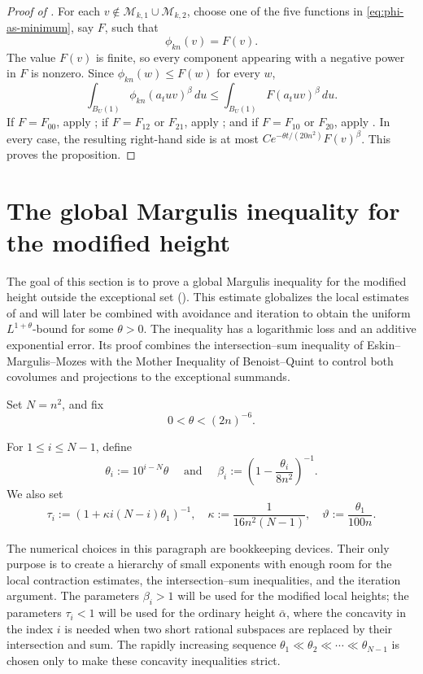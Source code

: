 \documentclass[reqno,11pt]{amsart}
\numberwithin{equation}{section}
\theoremstyle{definition}
\theoremstyle{remark}
\begin{document}
\begin{proof}[Proof of ]
For each $v\notin\mathcal M_{k,1}\cup\mathcal M_{k,2}$, choose one of
the five functions in \eqref{eq:phi-as-minimum}, say $F$, such that
$$
\phi_{kn}(v)=F(v).
$$
The value $F(v)$ is finite, so every component appearing with a negative
power in $F$ is nonzero. Since $\phi_{kn}(w)\le F(w)$ for every $w$,
$$
\int_{B_{U}(1)}\phi_{kn}(a_tuv)^\beta\,du
\le
\int_{B_{U}(1)}F(a_tuv)^\beta\,du.
$$
If $F=F_{00}$, apply ; if
$F=F_{12}$ or $F_{21}$, apply
; and if $F=F_{10}$ or $F_{20}$,
apply . In every case, the resulting right-hand
side is at most
$
C e^{-\theta t/(20n^2)}F(v)^\beta
$.
This proves the proposition.
\end{proof}




\section{The global Margulis inequality for the modified height}
\label{s:globalheight}
The goal of this section is to prove a global Margulis inequality for the modified height outside the exceptional set (). This estimate globalizes the
local estimates of  and will later be
combined with avoidance and iteration to obtain the uniform
$L^{1+\theta}$-bound for some $\theta>0$.
The inequality has a logarithmic loss and an additive exponential error.
Its proof combines the intersection--sum inequality of
Eskin--Margulis--Mozes \cite[Lemma~5.6]{eskin-margulis-mozes:1998} with
the Mother Inequality of Benoist--Quint
\cite[Proposition~3.1]{benoist-quint:2012} to control both covolumes and
projections
to the exceptional summands.
\medskip 

Set $N=n^2$, and fix
$$
0<\theta<(2n)^{-6}.
$$

For $1\le i\le N-1$, define
\begin{equation}\label{theta}
\theta_i:=10^{i-N}\theta
\quad \text{ and }\quad
\beta_i:=\left(1-\frac{\theta_i}{8n^2}\right)^{-1}.
\end{equation}
We also set
\begin{equation}\label{eta}
\tau_i:=
\left(1+\kappa i(N-i)\theta_1\right)^{-1},
\quad
\kappa:=\frac{1}{16n^2(N-1)},\quad\vartheta:=\frac{\theta_1}{100n}.
\end{equation}

The numerical choices in this paragraph are bookkeeping devices. Their only
purpose is to create a hierarchy of small exponents with enough room for the
local contraction estimates, the intersection--sum inequalities, and the
iteration argument. The parameters $\beta_i>1$ will be used for the
modified local heights; the parameters $\tau_i<1$ will be used for the
ordinary height $\bar\alpha$, where the concavity in the index $i$ is
needed when two short rational subspaces are replaced by their intersection
and sum. The rapidly increasing sequence
$\theta_1\ll\theta_2\ll\cdots\ll\theta_{N-1}$ is chosen only to make these
concavity inequalities strict.
\end{document}
